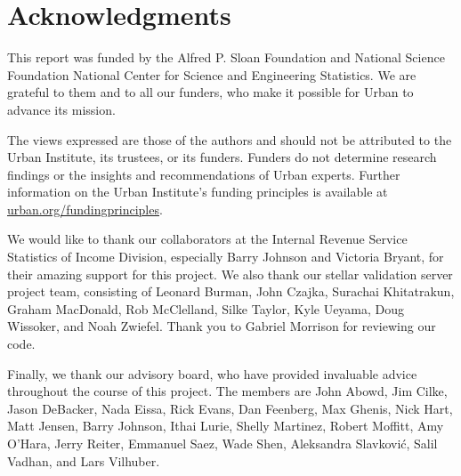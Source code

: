 \fancyfoot{}



\part{Acknowledgments}

This report was funded by the Alfred P. Sloan Foundation and National Science Foundation National Center for Science and Engineering Statistics. We are grateful to them and to all our funders, who make it possible for Urban to advance its mission. 

The views expressed are those of the authors and should not be attributed to the Urban Institute, its trustees, or its funders. Funders do not determine research findings or the insights and recommendations of Urban experts. Further information on the Urban Institute’s funding principles is available at \href{https://www.urban.org/aboutus/our-funding/funding-principles}{urban.org/fundingprinciples}.

We would like to thank our collaborators at the Internal Revenue Service Statistics of Income Division, especially Barry Johnson and Victoria Bryant, for their amazing support for this project. We also thank our stellar validation server project team, consisting of Leonard Burman, John Czajka, Surachai Khitatrakun, Graham MacDonald, Rob McClelland, Silke Taylor, Kyle Ueyama, Doug Wissoker, and Noah Zwiefel. Thank you to Gabriel Morrison for reviewing our code.

Finally, we thank our advisory board, who have provided invaluable advice throughout the course of this project. The members are John Abowd, Jim Cilke, Jason DeBacker, Nada Eissa, Rick Evans, Dan Feenberg, Max Ghenis, Nick Hart, Matt Jensen, Barry Johnson, Ithai Lurie,  Shelly Martinez, Robert Moffitt, Amy O'Hara, Jerry Reiter, Emmanuel Saez, Wade Shen, Aleksandra Slavkovi\'c, Salil Vadhan, and Lars Vilhuber.